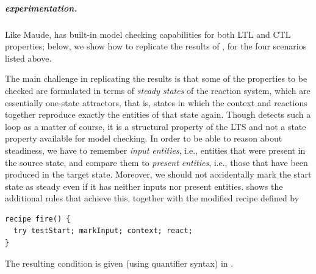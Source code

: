 \subparagraph*{\GROOVE experimentation.}

Like Maude, \GROOVE has built-in model checking capabilities for both LTL and CTL properties; below, we show how to replicate the results of \cite{DBLP:conf/cmsb/BallisBFO24}, for the four scenarios listed above.

The main challenge in replicating the results is that some of the properties to be checked are formulated in terms of \emph{steady states} of the reaction system, which are essentially one-state attractors, that is, states in which the context and reactions together reproduce exactly the entities of that state again. Though \GROOVE detects such a loop as a matter of course, it is a structural property of the LTS and not a state property available for model checking. In order to be able to reason about steadiness, we have to remember \emph{input entities}, i.e., entities that were present in the source state, and compare them to \emph{present entities}, i.e., those that have been produced in the target state. Moreover, we should not accidentally mark the start state as steady even if it has neither inputs nor present entities.  shows the additional rules that achieve this, together with the modified recipe defined by
%
\begin{lstlisting}
recipe fire() {
  try testStart; markInput; context; react;
}
\end{lstlisting}
%
The resulting \steadyR condition is given (using quantifier syntax) in .

